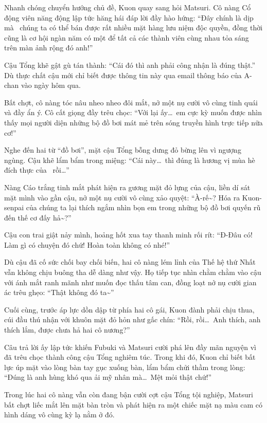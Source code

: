 \documentclass[../main.tex]{subfiles}
\begin{document}
Nhanh chóng chuyển hướng chủ đề, Kuon quay sang hỏi Matsuri. Cô nàng Cổ động viên năng động lập tức hăng hái đáp lời đầy hào hứng:
``Đây chính là dịp mà \hll\ chúng ta có thể bán được rất nhiều mặt hàng lưu niệm độc quyền, đồng thời cũng là cơ hội ngàn năm có một để tất cả các thành viên cùng nhau tỏa sáng trên màn ảnh rộng đó anh!''

Cậu Tổng khẽ gật gù tán thành: ``Cái đó thì anh phải công nhận là đúng thật.''  Dù thực chất cậu mới chỉ biết được thông tin này qua email thông báo của A-chan vào ngày hôm qua.

Bất chợt, cô nàng tóc nâu nheo nheo đôi mắt, nở một nụ cười vô cùng tinh quái và đầy ẩn ý. Cô cất giọng đầy trêu chọc: ``Với lại ấy\dots\ em cực kỳ muốn được nhìn thấy mọi người diện những bộ đồ bơi mát mẻ trên sóng truyền hình trực tiếp nữa cơ!''

Nghe đến hai từ ``đồ bơi'', mặt cậu Tổng bỗng dưng đỏ bừng lên vì ngượng ngùng. Cậu khẽ lẩm bẩm trong miệng: ``Cái này\dots\ thì đúng là hương vị mùa hè đích thực của \hll\ rồi\dots''

Nàng Cáo trắng tinh mắt phát hiện ra gương mặt đỏ lựng của cậu, liền dí sát mặt mình vào gần cậu, nở một nụ cười vô cùng xảo quyệt:
``À-rế\~{}? Hóa ra Kuon-senpai của chúng ta lại thích ngắm nhìn bọn em trong những bộ đồ bơi quyến rũ đến thế cơ đấy hả\~{}?''

Cậu con trai giật nảy mình, hoảng hốt xua tay thanh minh rối rít:
``Đ-Đâu có! Làm gì có chuyện đó chứ! Hoàn toàn không có nhé!''

Dù cậu đã cố sức chối bay chối biến, hai cô nàng lém lỉnh của Thế hệ thứ Nhất vẫn không chịu buông tha dễ dàng như vậy. Họ tiếp tục nhìn chằm chằm vào cậu với ánh mắt ranh mãnh như muốn đọc thấu tâm can, đồng loạt nở nụ cười gian ác trêu ghẹo:
``Thật không đó ta\~{}''

Cuối cùng, trước áp lực dồn dập từ phía hai cô gái, Kuon đành phải chịu thua, cúi đầu thú nhận với khuôn mặt đỏ hỏn như gấc chín:
``Rồi, rồi\dots\ Anh thích, anh thích lắm, được chưa hả hai cô nương?''

Câu trả lời ấy lập tức khiến Fubuki và Matsuri cười phá lên đầy mãn nguyện vì đã trêu chọc thành công cậu Tổng nghiêm túc. Trong khi đó, Kuon chỉ biết bất lực úp mặt vào lòng bàn tay gục xuống bàn, lẩm bẩm chửi thầm trong lòng: ``Đúng là anh hùng khó qua ải mỹ nhân mà\dots\ Mệt mỏi thật chứ!''

Trong lúc hai cô nàng vẫn còn đang bận cười cợt cậu Tổng tội nghiệp, Matsuri bất chợt liếc mắt lên mặt bàn tròn và phát hiện ra một chiếc mặt nạ màu cam có hình dáng vô cùng kỳ lạ nằm ở đó.
\end{document}
